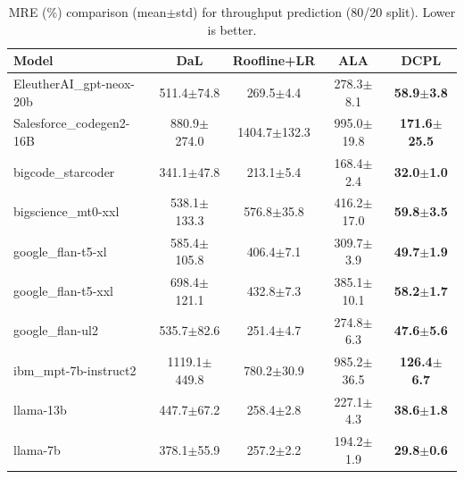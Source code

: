 \begin{table}[t]
\centering
\small
\begin{tabular}{lcccc}
\toprule
Model & DaL & Roofline+LR & ALA & DCPL \\
\midrule
EleutherAI\_gpt-neox-20b & 511.4$\pm$74.8 & 269.5$\pm$4.4 & 278.3$\pm$8.1 & \textbf{58.9$\pm$3.8} \\
Salesforce\_codegen2-16B & 880.9$\pm$274.0 & 1404.7$\pm$132.3 & 995.0$\pm$19.8 & \textbf{171.6$\pm$25.5} \\
bigcode\_starcoder & 341.1$\pm$47.8 & 213.1$\pm$5.4 & 168.4$\pm$2.4 & \textbf{32.0$\pm$1.0} \\
bigscience\_mt0-xxl & 538.1$\pm$133.3 & 576.8$\pm$35.8 & 416.2$\pm$17.0 & \textbf{59.8$\pm$3.5} \\
google\_flan-t5-xl & 585.4$\pm$105.8 & 406.4$\pm$7.1 & 309.7$\pm$3.9 & \textbf{49.7$\pm$1.9} \\
google\_flan-t5-xxl & 698.4$\pm$121.1 & 432.8$\pm$7.3 & 385.1$\pm$10.1 & \textbf{58.2$\pm$1.7} \\
google\_flan-ul2 & 535.7$\pm$82.6 & 251.4$\pm$4.7 & 274.8$\pm$6.3 & \textbf{47.6$\pm$5.6} \\
ibm\_mpt-7b-instruct2 & 1119.1$\pm$449.8 & 780.2$\pm$30.9 & 985.2$\pm$36.5 & \textbf{126.4$\pm$6.7} \\
llama-13b & 447.7$\pm$67.2 & 258.4$\pm$2.8 & 227.1$\pm$4.3 & \textbf{38.6$\pm$1.8} \\
llama-7b & 378.1$\pm$55.9 & 257.2$\pm$2.2 & 194.2$\pm$1.9 & \textbf{29.8$\pm$0.6} \\
\bottomrule
\end{tabular}

\caption{MRE (\%) comparison (mean$\pm$std) for throughput prediction (80/20 split). Lower is better.}
\label{tab:mre_dal_roofline_ala_dcpl}
\end{table}

